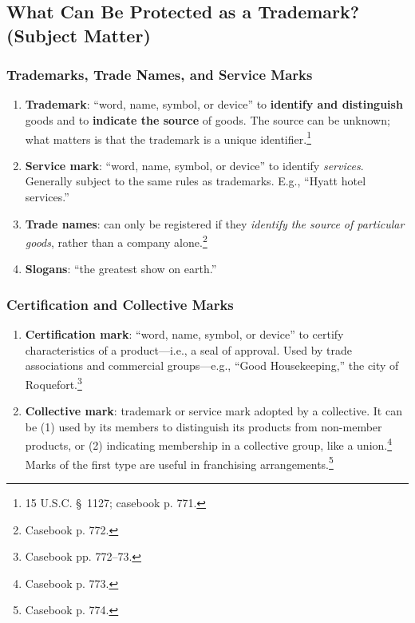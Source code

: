 \subsection{What Can Be Protected as a Trademark? (Subject Matter)}

\subsubsection{Trademarks, Trade Names, and Service Marks}

\begin{enumerate}
    \item \textbf{Trademark}: ``word, name, symbol, or device'' to 
    \textbf{identify and distinguish} goods and to \textbf{indicate the 
    source} of goods. The source can be unknown; what matters is that the 
    trademark is a unique identifier.\footnote{15 U.S.C. \S\ 1127; casebook p. 
    771.}
    \item \textbf{Service mark}: ``word, name, symbol, or device'' to identify 
    \emph{services}. Generally subject to the same rules as trademarks. E.g., 
    ``Hyatt hotel services.''
    \item \textbf{Trade names}: can only be registered if they \emph{identify 
    the source of particular goods}, rather than a company 
    alone.\footnote{Casebook p. 772.}
    \item \textbf{Slogans}: ``the greatest show on earth.''
\end{enumerate}

\subsubsection{Certification and Collective Marks}

\begin{enumerate}
    \item \textbf{Certification mark}: ``word, name, symbol, or device'' to 
    certify characteristics of a product---i.e., a seal of approval. Used by 
    trade associations and commercial groups---e.g., ``Good Housekeeping,'' 
    the city of Roquefort.\footnote{Casebook pp. 772--73.}
    \item \textbf{Collective mark}: trademark or service mark adopted by a 
    collective. It can be (1) used by its members to distinguish its products 
    from non-member products, or (2) indicating membership in a collective 
    group, like a union.\footnote{Casebook p. 773.} Marks of the first type 
    are useful in franchising arrangements.\footnote{Casebook p. 774.}
\end{enumerate}

